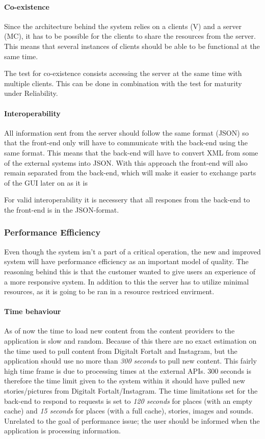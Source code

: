 \paragraph{Co-existence}
Since the architecture behind the system relies on a clients (V) and a server (MC), it has to be possible for the clients to share the resources from the server. This means that several instances of clients should be able to be functional at the same time.

The test for co-existence consists accessing the server at the same time with multiple clients. This can be done in combination with the test for maturity under Reliability.

\paragraph{Interoperability}
All information sent from the server should follow the same format (JSON) so that the front-end only will have to communicate with the back-end using the same format. This means that the back-end will have to convert XML from some of the external systems into JSON. With this approach the front-end will also remain separated from the back-end, which will make it easier to exchange parts of the GUI later on as it is

For valid interoperability it is necessery that all respones from the back-end to the front-end is in the JSON-format.

\subsubsection{Performance Efficiency}
Even though the system isn't a part of a critical operation, the new and improved system will have performance efficiency as an important model of quality. The reasoning behind this is that the customer wanted to give users an experience of a more responsive system. In addition to this the server has to utilize minimal resources, as it is going to be ran in a resource restriced envirment. 

\paragraph{Time behaviour}
As of now the time to load new content from the content providers to the application is slow and random. Because of this there are no exact estimation on the time used to pull content from Digitalt Fortalt and Instagram, but the application should use no more than \textit{300 seconds} to pull new content. This fairly high time frame is due to processing times at the external APIs. 300 seconds is therefore the time limit given to the system within it should have pulled new stories/pictures from Digitalt Fortalt/Instagram. The time limitations set for the back-end to respond to requests is set to \textit{120 seconds} for places (with an empty cache) and \textit{15 seconds} for places (with a full cache), stories, images and sounds. Unrelated to the goal of performance issue; the user should be informed when the application is processing information.

